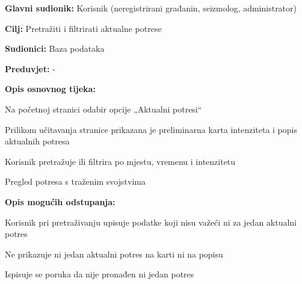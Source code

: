 			\noindent {}
			\begin{packed_item}
				
				\item \textbf{Glavni sudionik:} Korisnik (neregistrirani građanin, seizmolog, administrator)
				\item \textbf{Cilj:} Pretražiti i filtrirati aktualne potrese
				\item \textbf{Sudionici:} Baza podataka
				\item \textbf{Preduvjet:} -
				
				\item \textbf{Opis osnovnog tijeka:}
				
				\item[] \begin{packed_enum}
					\item Na početnoj stranici odabir opcije „Aktualni potresi“
					\item Prilikom učitavanja stranice prikazana je preliminarna karta intenziteta i popis aktualnih potresa
					\item Korisnik pretražuje ili filtrira po mjestu, vremenu i intenzitetu
					\item Pregled potresa s traženim svojstvima
				\end{packed_enum}
				
				\item  \textbf{Opis mogućih odstupanja:}
				
				\item[] \begin{packed_item}
					
					\item[3.a] Korisnik pri pretraživanju upisuje podatke koji nisu važeći ni za jedan aktualni potres
					\item[] \begin{packed_enum}
						
						\item Ne prikazuje ni jedan aktualni potres na karti ni na popisu
						\item Ispisuje se poruka da nije pronađen ni jedan potres
						
					\end{packed_enum}
					
				\end{packed_item}
				
			\end{packed_item}	
				
